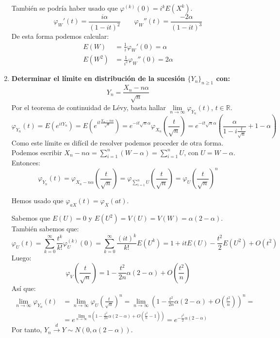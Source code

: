 \begin{exercise}
\begin{enumerate}
              También se podría haber usado que $\varphi^{(k)}(0) = i^k E(X^k)$.
              $$\varphi_W'(t) = \frac{i\alpha}{(1-it)^2} \qquad \varphi_W''(t) = \frac{-2\alpha}{(1-it)^3}$$
              De esta forma podemos calcular:
              \begin{align*}
                  E(W)   & = \frac{1}{i}\varphi_W'(0) = \alpha     \\
                  E(W^2) & = \frac{1}{i^2}\varphi_W''(0) = 2\alpha
              \end{align*}
        \item \textbf{Determinar el límite en distribución de la sucesión $\{Y_n\}_{n \geq 1}$ con:}
              $$Y_n = \frac{X_n - n\alpha}{\sqrt{n}}$$
              Por el teorema de continuidad de Lévy, basta hallar $\lim\limits_{n \to \infty} \varphi_{Y_n}(t)$, $t \in \mathbb{R}$.
              $$\varphi_{Y_n}(t) = E(e^{itY_n}) = E(e^{it\frac{X_n-n\alpha}{\sqrt{n}}}) = e^{-it\sqrt{n}\alpha}\varphi_{X_n}\left(\frac{t}{\sqrt{n}}\right) = e^{-it\sqrt{n}\alpha} \left(\frac{\alpha}{1-i\frac{t}{\sqrt{n}}} + 1-\alpha\right)$$
              Como este límite es difícil de resolver podemos proceder de otra forma.
              Podemos escribir $X_n - n\alpha = \sum_{i=1}^n (W - \alpha) = \sum_{i=1}^n U$, con $U = W-\alpha$.
              Entonces:
              $$\varphi_{Y_n}(t) = \varphi_{X_n - n\alpha} \left(\frac{t}{\sqrt{n}}\right) = \varphi_{\sum_{i=1}^n U} \left(\frac{t}{\sqrt{n}}\right) = \varphi_U \left(\frac{t}{\sqrt{n}}\right)^n$$

              \begin{note}
                  Hemos usado que $\varphi_{aX}(t) = \varphi_X(at)$.
              \end{note}

              Sabemos que $E(U) = 0$ y $E(U^2) = V(U) = V(W) = \alpha(2-\alpha)$.
              También sabemos que:
              $$\varphi_U(t) = \sum_{k=0}^\infty \frac{t^k}{k!} \varphi_U^{(k)}(0) = \sum_{k=0}^\infty \frac{(it)^k}{k!} E(U^k) = 1 + itE(U) - \frac{t^2}{2}E(U^2) + O(t^2)$$
              Luego:
              $$\varphi_V\left(\frac{t}{\sqrt{n}}\right) = 1 - \frac{t^2}{2n}\alpha(2-\alpha) + O\left(\frac{t^2}{n}\right)$$
              Así que:
              \begin{align*}
                  \lim\limits_{n \to \infty} \varphi_{Y_n}(t) & = \lim\limits_{n \to \infty} \varphi_U\left(\frac{t}{\sqrt{n}}\right)^n = \lim\limits_{n \to \infty} \left(1 - \frac{t^2}{2n}\alpha(2-\alpha) + O\left(\frac{t^2}{n}\right)\right)^n = \\
                                                              & = e^{\lim\limits_{n \to \infty} n\left(1 - \frac{t^2}{2n}\alpha(2-\alpha) + O\left(\frac{t^2}{n} - 1\right)\right)} = e^{-\frac{t^2}{2}\alpha(2-\alpha)}
              \end{align*}
              Por tanto, $Y_n \xrightarrow{d} Y \sim N(0, \alpha(2-\alpha))$.
    \end{enumerate}
\end{exercise}

